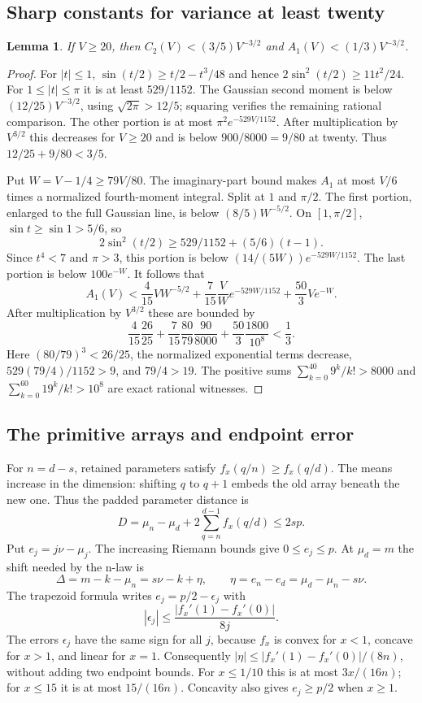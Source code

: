 \documentclass[11pt]{article}
\newtheorem{lemma}[theorem]{Lemma}
\theoremstyle{remark}\newtheorem{remark}[theorem]{Remark}
\begin{document}
\subsection{Sharp constants for variance at least twenty}\label{sec:sharp}
\begin{lemma}\label{lem:sharp}
If $V\ge20$, then $C_2(V)<(3/5)V^{-3/2}$ and
$A_1(V)<(1/3)V^{-3/2}$.
\end{lemma}
\begin{proof}
For $|t|\le1$, $\sin(t/2)\ge t/2-t^3/48$ and hence
$2\sin^2(t/2)\ge11t^2/24$. For $1\le|t|\le\pi$ it is at least
$529/1152$. The Gaussian second moment is below $(12/25)V^{-3/2}$,
using $\sqrt{2\pi}>12/5$; squaring verifies the remaining rational comparison.
The other portion is at most $\pi^2e^{-529V/1152}$.
After multiplication by $V^{3/2}$ this decreases for $V\ge20$ and is
below $900/8000=9/80$ at twenty. Thus $12/25+9/80<3/5$.

Put $W=V-1/4\ge79V/80$. The imaginary-part bound makes $A_1$ at most $V/6$
times a normalized fourth-moment integral. Split at $1$ and $\pi/2$.
The first portion, enlarged to the full Gaussian line, is below
$(8/5)W^{-5/2}$. On $[1,\pi/2]$, $\sin t\ge\sin1>5/6$, so
\[
 2\sin^2(t/2)\ge529/1152+(5/6)(t-1).
\]
Since $t^4<7$ and $\pi>3$, this portion is below
$(14/(5W))e^{-529W/1152}$. The last portion is below $100e^{-W}$.
It follows that
\[
 A_1(V)<\frac4{15}VW^{-5/2}
 +\frac7{15}\frac VW e^{-529W/1152}
 +\frac{50}{3}Ve^{-W}.
\]
After multiplication by $V^{3/2}$ these are bounded by
\[
 \frac4{15}\frac{26}{25}
 +\frac7{15}\frac{80}{79}\frac{90}{8000}
 +\frac{50}{3}\frac{1800}{10^8}<\frac13.
\]
Here $(80/79)^3<26/25$, the normalized exponential terms decrease,
$529(79/4)/1152>9$, and $79/4>19$.
The positive sums $\sum_{k=0}^{40}9^k/k!>8000$ and
$\sum_{k=0}^{60}19^k/k!>10^8$ are exact rational witnesses.
\end{proof}

\subsection{The primitive arrays and endpoint error}\label{sec:arrays}
For $n=d-s$, retained parameters satisfy $f_x(q/n)\ge f_x(q/d)$.
The means increase in the dimension: shifting $q$ to $q+1$ embeds the old
array beneath the new one. Thus the padded parameter distance is
\begin{equation}\label{eq:D}
 D=\mu_n-\mu_d+2\sum_{q=n}^{d-1}f_x(q/d)\le2sp.
\end{equation}
Put $e_j=j\nu-\mu_j$. The increasing Riemann bounds give $0\le e_j\le p$.
At $\mu_d=m$ the shift needed by the n-law is
\[
 \Delta=m-k-\mu_n=s\nu-k+\eta,\qquad
 \eta=e_n-e_d=\mu_d-\mu_n-s\nu.
\]
The trapezoid formula writes $e_j=p/2-\epsilon_j$ with
\[
 |\epsilon_j|\le\frac{|f_x'(1)-f_x'(0)|}{8j}.
\]
The errors $\epsilon_j$ have the same sign for all $j$, because $f_x$ is
convex for $x<1$, concave for $x>1$, and linear for $x=1$. Consequently
$|\eta|\le |f_x'(1)-f_x'(0)|/(8n)$, without adding two endpoint bounds.
For $x\le1/10$ this is at most $3x/(16n)$; for $x\le15$ it is at most
$15/(16n)$. Concavity also gives $e_j\ge p/2$ when $x\ge1$.
\end{document}
